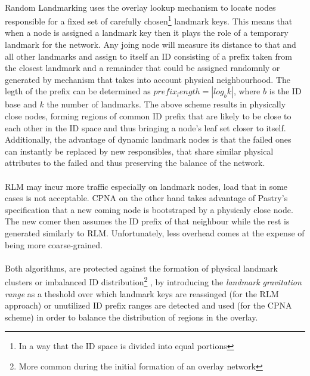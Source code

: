 \documentclass[a4paper,10pt]{article}
\begin{document}
\paragraph{}
Random Landmarking uses the overlay lookup mechanism to locate nodes responsible for a fixed set of carefully chosen\footnote{In a way that the ID space is divided into equal portions} landmark keys. This means that when a node is assigned a landmark key then it plays the role of a temporary landmark for the network. Any joing node will measure its distance to that and all other landmarks and assign to itself an ID consisting of a prefix taken from the closest landmark and a remainder that could be assigned randomnly or generated by mechanism that takes into account physical neighbourhood. The legth of the prefix can be determined as $prefix_length=|log_b k|$, where $b$ is the ID base and $k$ the number of landmarks. The above scheme results in physically close nodes, forming regions of common ID prefix that are likely to be close to each other in the ID space and thus bringing a node's leaf set closer to itself. Additionally, the advantage of dynamic landmark nodes is that the failed ones can instantly be replaced by new responsibles, that share similar physical attributes to the failed and thus preserving the balance of the network.

\paragraph{}
RLM may incur more traffic especially on landmark nodes, load that in some cases is not acceptable. CPNA on the other hand takes advantage of Pastry's specification that a new coming node is bootstraped by a physicaly close node. The new comer then assumes the ID prefix of that neighbour while the rest is generated similarly to RLM. Unfortunately, less overhead comes at the expense of being more coarse-grained.

\paragraph{}
Both algorithms, are protected against the formation of physical landmark clusters or imbalanced ID distribution\footnote{More common during the initial formation of an overlay network} , by introducing the \emph{landmark gravitation range} as a theshold over which landmark keys are reassinged (for the RLM approach) or unutilized ID prefix ranges are detected and used (for the CPNA scheme) in order to balance the distribution of regions in the overlay.
\end{document}

